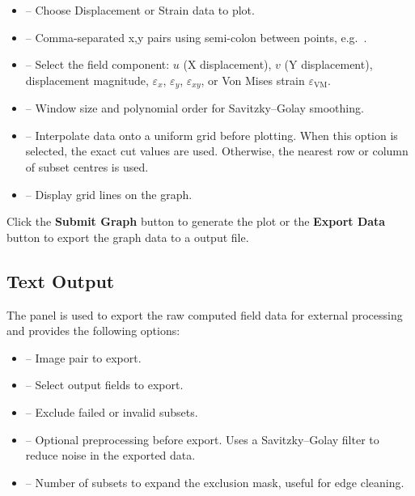 \begin{itemize}
	\item {} -- Choose Displacement or Strain data to plot.
	\item {} -- Comma-separated x,y pairs using semi-colon between points, e.g.\ .
	\item {} -- Select the field component: $u$ (X displacement), $v$ (Y displacement), displacement magnitude, $\varepsilon_x$, $\varepsilon_y$, $\varepsilon_{xy}$, or Von Mises strain $\varepsilon_\text{VM}$.
	\item {} -- Window size and polynomial order for Savitzky--Golay smoothing.
	\item {} -- Interpolate data onto a uniform grid before plotting. When this option is selected, the exact cut values are used. Otherwise, the nearest row or column of subset centres is used.
	\item {} -- Display grid lines on the graph.
\end{itemize}

Click the \textbf{Submit Graph} button to generate the plot or the \textbf{Export Data} button to export the graph data to a  output file.

\subsection{Text Output}

The  panel is used to export the raw computed field data for external processing and provides the following options:

\begin{itemize}
	\item {} -- Image pair to export.
	\item {} -- Select output fields to export.
	\item {} -- Exclude failed or invalid subsets.
	\item {} -- Optional preprocessing before export. Uses a Savitzky--Golay filter to reduce noise in the exported data.
	\item {} -- Number of subsets to expand the exclusion mask, useful for edge cleaning.
\end{itemize}

